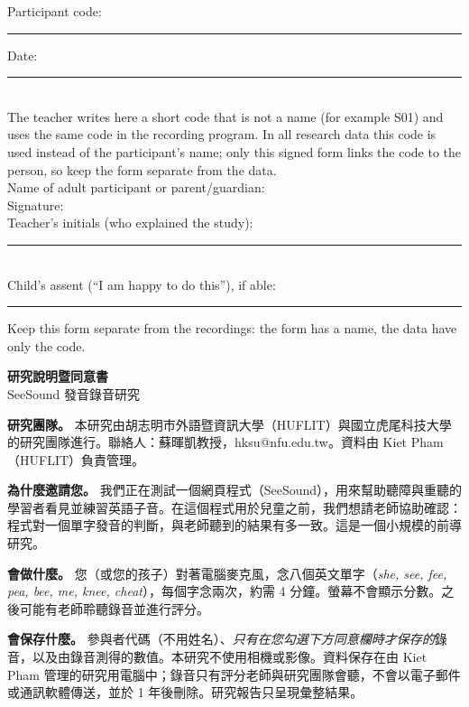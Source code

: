\documentclass[11pt,a4paper]{article}
\begin{document}
\vspace{6pt}
\newcommand{\line}[2]{\noindent #1 \hrulefill\hspace{1em}#2 \rule{4cm}{0.4pt}\\[12pt]}
\noindent Participant code: \rule{3.5cm}{0.4pt}\hfill Date: \rule{4cm}{0.4pt}\\[2pt]
{\footnotesize\noindent The teacher writes here a short code that is not a name (for example S01) and uses the same code in the recording program. In all research data this code is used instead of the participant's name; only this signed form links the code to the person, so keep the form separate from the data.}\\[12pt]
\noindent Name of adult participant or parent/guardian: \hrulefill\\[12pt]
\noindent Signature: \hrulefill\\[12pt]
\noindent Teacher's initials (who explained the study): \rule{3cm}{0.4pt}\\[12pt]
\noindent Child's assent (``I am happy to do this''), if able: \rule{4cm}{0.4pt}

\vspace{4pt}\footnotesize Keep this form separate from the recordings: the form has a name, the data have only the code.

\newpage
\begin{center}{\Large\bfseries 研究說明暨同意書}\\[2pt]
SeeSound 發音錄音研究\end{center}

\textbf{研究團隊。} 本研究由胡志明市外語暨資訊大學（HUFLIT）與國立虎尾科技大學的研究團隊進行。聯絡人：蘇暉凱教授，hksu@nfu.edu.tw。資料由 Kiet Pham（HUFLIT）負責管理。

\textbf{為什麼邀請您。} 我們正在測試一個網頁程式（SeeSound），用來幫助聽障與重聽的學習者看見並練習英語子音。在這個程式用於兒童之前，我們想請老師協助確認：程式對一個單字發音的判斷，與老師聽到的結果有多一致。這是一個小規模的前導研究。

\textbf{會做什麼。} 您（或您的孩子）對著電腦麥克風，念八個英文單字（\textit{she, see, fee, pea, bee, me, knee, cheat}），每個字念兩次，約需 4 分鐘。螢幕不會顯示分數。之後可能有老師聆聽錄音並進行評分。

\textbf{會保存什麼。} 參與者代碼（不用姓名）、\textit{只有在您勾選下方同意欄時才保存的}錄音，以及由錄音測得的數值。本研究不使用相機或影像。資料保存在由 Kiet Pham 管理的研究用電腦中；錄音只有評分老師與研究團隊會聽，不會以電子郵件或通訊軟體傳送，並於 1 年後刪除。研究報告只呈現彙整結果。
\end{document}
